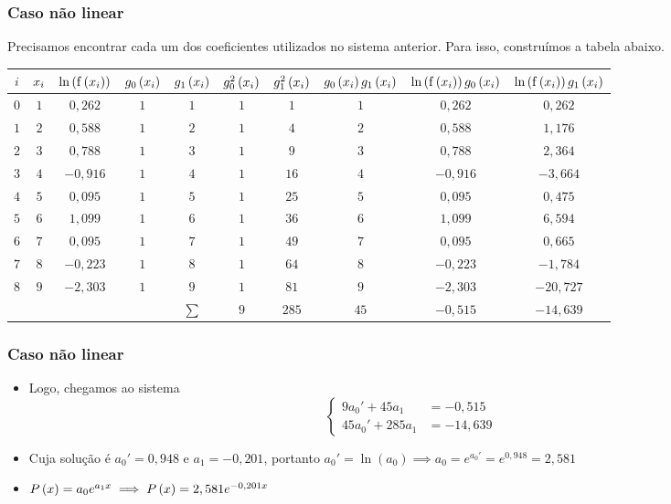 \begin{frame}
\frametitle{Caso não linear}

Precisamos encontrar cada um dos coeficientes utilizados no sistema anterior. Para isso, construímos a tabela abaixo.

\footnotesize
\begin{tabular}{c|c|c|c|c|c|c|c|c|c}
$i$ & 
  $x_i$ & 
  $\operatorname{\mathrm{ln}} \left( \mathrm{f} \left(x_i\right) \right)$ &
  $g_0 \left(x_i\right)$ &
  $g_1 \left(x_i\right)$ &
  $g_0^2 \left(x_i\right)$ &
  $g_1^2 \left(x_i\right)$ &
  $g_0 \left(x_i\right) g_1 \left(x_i\right)$ &
  $\operatorname{\mathrm{ln}} \left(\mathrm{f} \left(x_i\right) \right) g_0 \left(x_i\right)$ &
  $\operatorname{\mathrm{ln}} \left(\mathrm{f} \left(x_i\right) \right) g_1 \left(x_i\right)$\\
\hline
$0$ & $1$  & $0,262$   & $1 $ & $1 $ & $1 $ & $1 $  & $1 $ & $0,262$ & $0,262$\\
\hline
$1$ & $2 $ & $0,588 $  & $1 $ & $2 $ & $1 $ & $4 $  & $2 $ & $0,588 $ & $1,176 $\\
\hline
$2$ & $3 $ & $0,788 $  & $1 $ & $3 $ & $1 $ & $9 $  & $3 $ & $0,788 $ & $2,364 $\\
\hline
$3$ & $4 $ & $-0,916 $ & $1 $ & $4 $ & $1 $ & $16 $ & $4 $ & $-0,916 $ & $-3,664 $\\
\hline
$4$ & $5 $ & $0,095 $  & $1 $ & $5 $ & $1 $ & $25 $ & $5 $ & $0,095 $ & $0,475 $\\
\hline
$5$ & $6 $ & $1,099 $  & $1 $ & $6 $ & $1 $ & $36 $ & $6 $ & $1,099 $ & $6,594 $\\
\hline
$6$ & $7 $ & $0,095 $  & $1 $ & $7 $ & $1 $ & $49 $ & $7 $ & $0,095 $ & $0,665 $\\
\hline
$7$ & $8 $ & $-0,223 $ & $1 $ & $8 $ & $1 $ & $64 $ & $8 $ & $-0,223 $ & $-1,784 $\\
\hline
$8$ & $9 $ & $-2,303 $ & $1 $ & $9 $ & $1 $ & $81 $ & $9 $ & $-2,303 $ & $-20,727 $\\
\hline
\onslide<2->{& & & & $\sum$ & $9 $ & $285 $ & $45 $ & $-0,515 $ & $-14,639 $}
\end{tabular}
\end{frame}

\begin{frame}
\frametitle{Caso não linear}

\begin{itemize}
  \item Logo, chegamos ao sistema
\[
\begin{cases}
9 a_0' + 45 a_1 &= -0,515 \\
45 a_0' + 285 a_1 &= -14,639
\end{cases}
\]
  \item Cuja solução é $a_0' = 0,948$ e $a_1 = -0,201$, portanto $a_0' = \ln \left(a_0\right) \implies a_0 = e^{a_0'} = e^{0,948} = 2,581$
  \item $P \left(x\right) = a_0 e^{a_1 x} \implies P \left(x\right) = 2,581 e^{-0,201 x}$
\end{itemize}
\end{frame}

